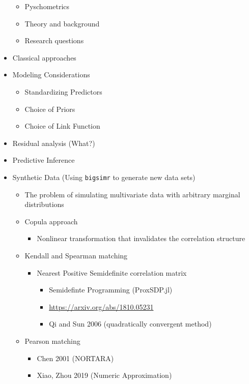 \documentclass[
]{article}
\providecommand{\tightlist}{%
  \setlength{\itemsep}{0pt}\setlength{\parskip}{0pt}}
\begin{document}
\begin{itemize}
  \begin{itemize}
  \tightlist
  \item
    Pyschometrics
  \item
    Theory and background
  \item
    Research questions
  \end{itemize}
\item
  Classical approaches
\item
  Modeling Considerations

  \begin{itemize}
  \tightlist
  \item
    Standardizing Predictors
  \item
    Choice of Priors
  \item
    Choice of Link Function
  \end{itemize}
\item
  Residual analysis (What?)
\item
  Predictive Inference
\item
  Synthetic Data (Using \texttt{bigsimr} to generate new data sets)

  \begin{itemize}
  \tightlist
  \item
    The problem of simulating multivariate data with arbitrary marginal distributions
  \item
    Copula approach

    \begin{itemize}
    \tightlist
    \item
      Nonlinear transformation that invalidates the correlation structure
    \end{itemize}
  \item
    Kendall and Spearman matching

    \begin{itemize}
    \tightlist
    \item
      Nearest Positive Semidefinite correlation matrix

      \begin{itemize}
      \tightlist
      \item
        Semidefinte Programming (ProxSDP.jl)
      \item
        \url{https://arxiv.org/abs/1810.05231}
      \item
        Qi and Sun 2006 (quadratically convergent method)
      \end{itemize}
    \end{itemize}
  \item
    Pearson matching

    \begin{itemize}
    \tightlist
    \item
      Chen 2001 (NORTARA)
    \item
      Xiao, Zhou 2019 (Numeric Approximation)
    \end{itemize}
  \end{itemize}
\end{itemize}
\end{document}
